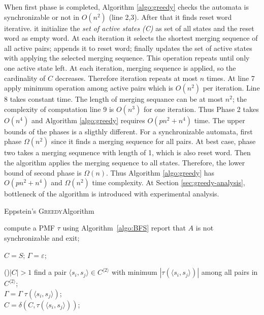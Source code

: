 \documentclass[12pt]{article}
\newcommand{\comment}[2]{{\color{red}{\bf (#1: #2)}}}
\newcommand{\greedyAlgo}{\textsc{Greedy}}
\begin{document}
When first phase is completed, Algorithm \ref{algo:greedy} checks the automata is synchronizable or not in $O(n^2)$ (line 2,3). After that it finds reset word iterative. it initialize the \textit{set of active states (C)} as set of all states and the reset word as empty word. At each iteration it selects the shortest merging sequence of all active pairs; appends it to reset word; finally updates the set of active states with applying the selected merging sequence. This operation repeats until only one active state left. At each iteration, merging sequence is applied, so the cardinality of $C$ decreases. Therefore iteration repeats at most $n$ times. At line 7 apply minimum operation among active pairs which is $O(n^2)$ per iteration. Line 8 takes constant time. The length of merging sequance can be at most $n^2$; the complexity of computation line 9 is $O(n^3)$ for one iteration. Thus Phase 2 takes $O(n^4)$ and Algorithm \ref{algo:greedy} requires $O(pn^2 + n^4)$ time. The upper bounds of the phases is a sligthly different. For a synchronizable automata, first phase $\Omega(n^2)$ since it finds a merging sequence for all pairs. At best case, phase two takes a merging sequnence with length of 1, which is also reset word. Then the algorithm applies the merging sequence to all states. Therefore, the lower bound of second phase is $\Omega(n)$. Thus Algorithm \ref{algo:greedy} has $O(pn^2 + n^4)$ and $\Omega(n^2)$ time complexity. At Section \ref{sec:greedy-analysis}, bottleneck of the algorithm is introduced with experimental analysis. 

\comment{sertac}{complexity $O(n^3)$ mu demeliyiz yoksa $O(n^4)$ mu? interediate phaseden bahsetmeli miyiz?}

\begin{algorithm}[ht]
	\label{algo:greedy}
	\caption{Eppstein's \greedyAlgo \space Algorithm}
	
	
	compute a PMF $\tau$ using Algorithm~\ref{algo:BFS}\;
	{
		report that $A$ is not synchronizable and exit;	
	}

	
	$C = S$; 
	$\Gamma = \varepsilon$; 
	
	\While(){$|C| > 1$}
	{
		find a pair $\langle s_i,s_j \rangle \in C^{\langle 2 \rangle}$ 
		with minimum $|\tau(\langle s_i,s_j \rangle)|$ among all pairs 
		in $C^{\langle 2 \rangle}$;\\
		
		
		$\Gamma = \Gamma \; \tau(\langle s_i,s_j \rangle)$;\\
		$C = \delta(C,\tau(\langle s_i,s_j \rangle))$;
	}
\end{algorithm}
\end{document}
